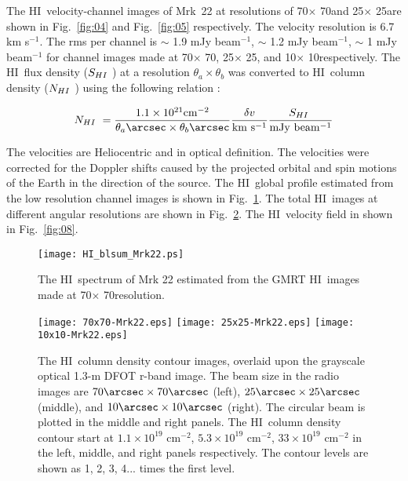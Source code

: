 \documentclass[useAMS,usenatbib]{mn2e}
\def\HI{H{\small{I}}~}
\begin{document}
The \HI velocity-channel images of Mrk~22 at resolutions of 70\arcsec $\times$ 70\arcsec and 25\arcsec $\times$ 25\arcsec are shown in Fig.~\ref{fig:04} and Fig.~\ref{fig:05} respectively. The velocity resolution is 6.7 km s$^{-1}$. The rms per channel is $\sim$ 1.9 mJy beam$^{-1}$, $\sim$ 1.2 mJy beam$^{-1}$, $\sim$ 1 mJy beam$^{-1}$ for channel images made at 70\arcsec $\times$ 70\arcsec, 25\arcsec $\times$ 25\arcsec, and 10\arcsec $\times$ 10\arcsec respectively. The \HI flux density ($S_{\HI}$) at a resolution $\theta_{a} \times \theta_{b}$ was converted to \HI column density ($N_{\HI}$) using the following relation \citep{1978ppim.book.....S}: 

\begin{equation}
N_{\HI} = \frac{1.1\times10^{21}\mathrm {cm^{-2}}}{\theta_{a}\arcsec \times \theta_{b}\arcsec} \frac{\delta v}{\mathrm{km~s^{-1}}}\frac{S_{\HI}}{\mathrm{mJy~beam^{-1}}}
\end{equation} 

The velocities are Heliocentric and in optical definition. The velocities were corrected for the Doppler shifts caused by the projected orbital and spin motions of the Earth in the direction of the source. The \HI global profile estimated from the low resolution  channel images is shown in Fig.~\ref{fig:06}. The total \HI images at  different angular resolutions are shown in Fig.~\ref{fig:07}. The \HI velocity field in shown in Fig.~\ref{fig:08}.

\begin{figure*}
\centering
\texttt{[image: HI\_blsum\_Mrk22.ps]}
\caption{The \HI spectrum of Mrk 22 estimated from the GMRT \HI images made at 70\arcsec $\times$ 70\arcsec resolution.}
\label{fig:06}
\end{figure*}

\begin{figure*}
\centering
\texttt{[image: 70x70-Mrk22.eps]}
\texttt{[image: 25x25-Mrk22.eps]}
\texttt{[image: 10x10-Mrk22.eps]}
\caption{The \HI column density contour images, overlaid upon the grayscale optical 1.3-m DFOT r-band image. The beam size in the radio images are $70 \arcsec\times 70\arcsec$ (left), $25 \arcsec \times 25\arcsec$ (middle), and $10\arcsec \times 10\arcsec$ (right). The circular beam is plotted in the middle and right panels. The \HI column density contour start at $1.1\times10^{19}$ cm$^{-2}$,  $5.3\times10^{19}$ cm$^{-2}$, $33\times10^{19}$ cm$^{-2}$ in the left, middle, and right panels respectively. The contour levels are shown as 1, 2, 3, 4... times the first level.}
\label{fig:07}
\end{figure*}
\end{document}
